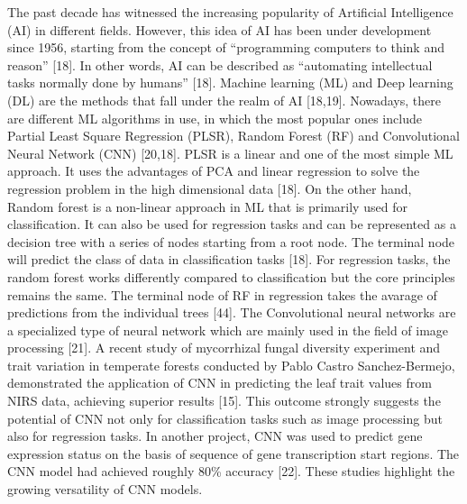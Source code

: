 \documentclass[12pt,a4paper]{report}
\begin{document}
The past decade has witnessed the increasing popularity of  Artificial Intelligence (AI) in different fields. However, this idea of AI has been under development since 1956, starting from the concept of “programming computers to think and reason” [18]. In other words, AI can be described as “automating intellectual tasks normally done by humans” [18]. Machine learning (ML) and Deep learning (DL) are the methods that fall under the realm of AI [18,19]. 
Nowadays, there are different ML algorithms in use, in which the most popular ones include Partial Least Square Regression (PLSR), Random Forest (RF) and Convolutional Neural Network (CNN) [20,18]. PLSR is a linear and one of the most simple ML approach. It uses the advantages of PCA and linear regression to solve the regression problem in the high dimensional data [18]. On the other hand,  Random forest is a non-linear approach in ML that is primarily used for classification. It can also 
be used for regression tasks and can be represented as a decision tree with a series of nodes starting from a root node. The terminal node will predict the class of data in classification tasks [18]. For regression tasks, the random forest works differently compared to classification but the core principles remains the same. The terminal node of RF in regression takes the avarage of predictions from the individual trees [44]. The Convolutional neural networks are a specialized type of neural network which are mainly used in the field of image processing [21]. A recent study of mycorrhizal fungal diversity experiment and  trait variation in temperate forests  conducted by Pablo Castro Sanchez-Bermejo, 
demonstrated the application of CNN in predicting the leaf trait values from NIRS data, achieving superior results [15]. This outcome strongly suggests the potential of CNN not only for classification tasks such as image processing but also for regression tasks. In another project, CNN was used to predict gene expression status on the basis of sequence of gene transcription start regions. The CNN model had achieved roughly 80\% accuracy [22]. 
These studies highlight the growing versatility of CNN models. \\
\end{document}
